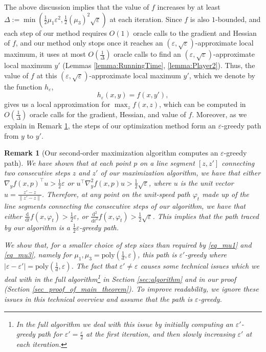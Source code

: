 \documentclass[11pt,letterpaper]{article}
\renewcommand{\epsilon}{\varepsilon}
\newcommand{\coloneqq}{:=}
\newtheorem{remark}[theorem]{Remark}
\begin{document}
The above discussion implies that the value of $f$ increases by at least  $\Delta \coloneqq \min(\frac{1}{2} \mu_1 \epsilon^2, \frac{1}{2} (\mu_3)^2 \sqrt{\epsilon})$ at each iteration.
%
Since $f$ is also $1$-bounded, and each step of our method requires $O(1)$ oracle calls to the gradient and Hessian of $f$, and our method only stops once it reaches an  $(\epsilon, \sqrt{\epsilon})$-approximate local maximum, it uses at most $O(\frac{1}{\Delta})$ oracle calls to find an $(\epsilon, \sqrt{\epsilon})$-approximate local maximum $y'$ (Lemmas \ref{lemma:RunningTime}, \ref{lemma:Player2}).
%
 Thus, the value of $f$ at this  $(\epsilon, \sqrt{\epsilon})$-approximate local maximum $y'$, which we denote by the function $h_\epsilon$,
 \begin{equation} \label{eq_h_eps}  
 h_\epsilon(x,y) = f(x, y'),
 \end{equation}
 gives us a local approximation for $\max_{z} f(x,z)$, which can be computed in $O(\frac{1}{\Delta})$ oracle calls for the gradient, Hessian, and value of $f$. %
%
Moreover, as we explain in Remark \ref{rem_greedy_path}, the steps of our optimization method form an $\epsilon$-greedy path from $y$ to $y'$.%
 
 
\begin{remark}[{Our second-order maximization algorithm computes an $\epsilon$-greedy path}] \label{rem_greedy_path}
%
We have shown that at each point $p$ on a line segment $[z, z']$ connecting two consecutive steps $z$ and $z'$ of our maximization algorithm, we have that either  $\nabla_y f(x,p)^\top u > \frac{1}{2} \epsilon$  or $u^\top \nabla_y^2 f(x,p) u > \frac{1}{2} \sqrt{\epsilon}$, where $u$ is the unit vector $u = \frac{z'-z}{\|z'-z\|}$.
%
%
%
 Therefore, at any point on the unit-speed path $\varphi_t$ made up of the line segments connecting the consecutive steps of our algorithm, we have that either $\frac{\mathrm{d}}{\mathrm{d}t} f(x, \varphi_t) > \frac{1}{2} \epsilon$, or $\frac{\mathrm{d}^2}{\mathrm{d}t^2} f(x, \varphi_t)  > \frac{1}{2} \sqrt{\epsilon}$.
%
This implies that the path traced by our algorithm is a $\frac{1}{2} \epsilon$-greedy path. 

% 
We show that, for a smaller choice of step sizes than required by \eqref{eq_mu1} and \eqref{eq_mu3}, namely for  $\mu_1, \mu_3 = \mathrm{poly}\left(\frac{1}{d}, \epsilon\right) $, this path is $\epsilon'$-greedy where $|\epsilon- \epsilon'| = \mathrm{poly}\left(\frac{1}{d}, \epsilon\right)$.
%
 The fact that $\epsilon' \neq \epsilon$ causes some technical issues which we deal with in the full algorithm\footnote{In the full algorithm we deal with this issue by initially computing an $\epsilon'$-greedy path for $\epsilon' = \frac{\epsilon}{2}$ at the first iteration, and then slowly increasing $\epsilon'$ at each iteration.} in Section \ref{sec:algorithm} and in our proof (Section 
 \ref{sec_proof_of_main_theorem}).  To improve readability, we ignore these issues in this technical overview and assume that the path is $\epsilon$-greedy.
%
 \end{remark}
\end{document}
